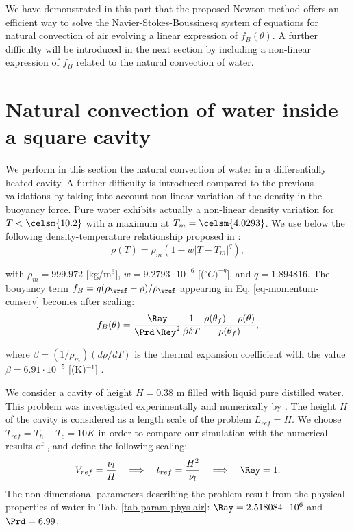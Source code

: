 We have demonstrated in this part that the proposed Newton method offers an efficient way to solve the Navier-Stokes-Boussinesq system of equations for natural convection of air evolving a linear expression of $f_B(\theta)$.
A further difficulty will be introduced in the next section by including a non-linear expression of $f_B$ related to the natural convection of water.

\section{Natural convection of water inside a square cavity}\label{sec: natconv-water}
We perform in this section the natural convection of water in a differentially heated cavity. 
A further difficulty is introduced compared to the previous validations by taking into account non-linear variation of the density in the buoyancy force.
Pure water exhibits actually a non-linear density variation for $T< \celsm{10.2}$ with a maximum at $T_m= \celsm{4.0293}$. 
We use below the following density-temperature relationship  proposed in \cite{Gebhart1977}:
\begin{equation}\label{eq-dens-nonlin}
\rho(T)=\rho_m \left(1 - w \left|T - T_m\right|^q\right),
\end{equation}

\noindent with $\rho_m=999.972$ [kg/m$^3$], $w=9.2793\cdot 10^{-6}$ [($^\circ C)^{-q}$], and $q=1.894816$.
The bouyancy term $f_B = g(\rho_\vref-\rho)/\rho_\vref$ appearing in Eq. \ref{eq-momentum-conserv}  becomes after scaling:
\begin{equation}
f_B(\theta) = \frac{\Ray}{\Prd \, \Rey^2} \frac{1}{\beta \delta T}\, \frac{\rho(\theta_f)-\rho(\theta)}{\rho(\theta_f)},
\label{eq-fBnonlin}
\end{equation}

\noindent where $\beta=(1/\rho_m) \left(d\rho/dT\right)$ is the thermal expansion coefficient with the value $\beta=6.91 \cdot 10^{-5}$ [(K)$^{-1}$] \citep{Scanlon2004}.

We consider a cavity of height $H = 0.38$ m filled with liquid pure distilled water.
This problem was investigated experimentally and numerically by \cite{Giangi-2000,Kowalewski-1999,Kowalewski-2003}.
The height $H$ of the cavity is considered as a length scale of the problem $L_{ref} = H$. 
We choose $T_{ref} = T_h - T_c = 10 K$ in order to compare our simulation with the numerical results of \cite{Kowalewski-2003},
and define the following scaling:
\begin{equation} \label{eq-def-scal-1}
   V_{ref} = \frac{\nu_l}{H} 
   \quad \Longrightarrow \quad t_{ref} = \frac{H^2}{\nu_l}
   \quad \Longrightarrow \quad \Rey = 1.
\end{equation} 
The non-dimensional parameters describing the problem result from the physical properties of water in Tab. \ref{tab-param-phys-air}: $\Ray=2.518084\cdot 10^{6}$ and $\Prd=6.99$. %

